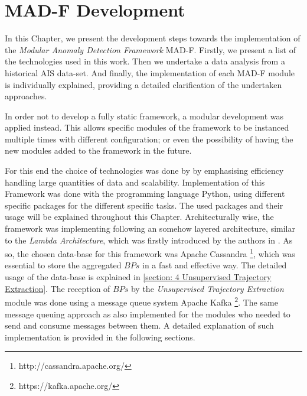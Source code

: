 \chapter{MAD-F Development}
\label{chapter:Chapter 4}

In this Chapter, we present the development steps towards the implementation of the \emph{Modular Anomaly Detection Framework} MAD-F. Firstly, we present a list of the technologies used in this work. Then we undertake a data analysis from a historical AIS data-set. And finally, the implementation of each MAD-F module is individually  explained, providing a detailed clarification of the undertaken approaches.


In order not to develop a fully static framework, a modular development was applied instead. This allows specific modules of the framework to be instanced multiple times with different configuration; or even the possibility of having the new modules added to the framework in the future.

For this end the choice of technologies was done by by emphasising efficiency handling large quantities of data and scalability. Implementation of this Framework was done with the programming language Python, using different specific packages for the different specific tasks. The used packages and their usage will be explained throughout this Chapter. Architecturally wise, the framework was implementing following an somehow layered architecture, similar to the \emph{Lambda Architecture}, which was firstly introduced by the authors in \cite{Marz2015BigSystems}. As so, the chosen data-base for this framework was Apache Cassandra \footnote{http://cassandra.apache.org/}, which was essential to store the aggregated $BPs$ in a fast and effective way. The detailed usage of the data-base is explained in \ref{section: 4 Unsupervised Trajectory Extraction}. The reception of $BPs$ by the \emph{Unsupervised Trajectory Extraction} module was done using a message queue system Apache Kafka \footnote{https://kafka.apache.org/}. The same message queuing approach as also implemented for the modules who needed to send and consume messages between them. A detailed explanation of such implementation is provided in the following sections.

